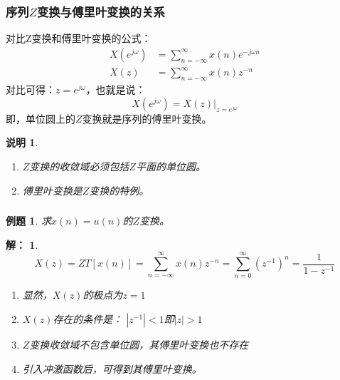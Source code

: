 \documentclass[notheorems,compress,mathserif,table]{beamer}
\newtheorem{example}{例题}
\newtheorem{answer}{解：}
\newtheorem{shuoming}{说明}
\begin{document}
\begin{frame}\frametitle{序列$Z$变换与傅里叶变换的关系}%
对比Z变换和傅里叶变换的公式：
\begin{equation*}
\begin{split}
X(e^{j\omega}) &= \sum_{n=-\infty}^{\infty}x(n)e^{-j\omega n}\\
X(z) \:\:     &= \sum_{n=-\infty}^{\infty}x(n)z^{-n}
\end{split}
\end{equation*}
对比可得：$z = e^{j\omega}$，也就是说：
$$X(e^{j\omega}) = X(z)|_{z=e^{j\omega}}$$
即，单位圆上的$Z$变换就是序列的傅里叶变换。\par
\begin{shuoming}
\begin{enumerate}
\item $Z$变换的收敛域必须包括$Z$平面的单位圆。
\item 傅里叶变换是$Z$变换的特例。
\end{enumerate}
\end{shuoming}
\quad\newline

\end{frame}



\begin{frame}\frametitle{}%
\begin{example}
求$x(n)=u(n)$的$Z$变换。\par
\end{example}
\begin{answer}
$$X(z) = ZT[x(n)] = \sum_{n=-\infty}^{\infty}x(n)z^{- n} = \sum_{n=0}^{\infty}(z^{-1})^{ n} = \frac{1}{1-z^{-1}}$$
\begin{enumerate}
\item [1] 显然，$X(z)$的极点为$z=1$
\item [2]$X(z)$存在的条件是： \quad $|z^{-1}|<1$\quad 即$|z|>1$
\item [3]$Z$变换收敛域不包含单位圆，其傅里叶变换也不存在
\item [4]引入冲激函数后，可得到其傅里叶变换。
\end{enumerate}

\end{answer}

\end{frame}
\end{document}
